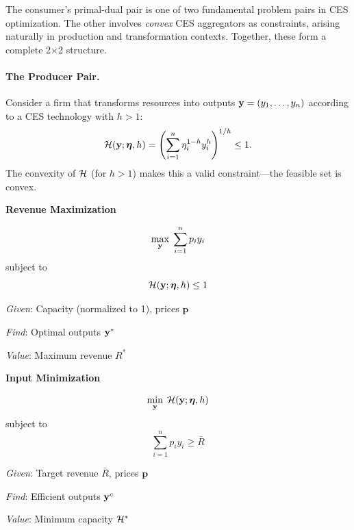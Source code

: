 The consumer's primal-dual pair is one of two fundamental problem pairs in CES optimization. The other involves \emph{convex} CES aggregators as constraints, arising naturally in production and transformation contexts. Together, these form a complete 2×2 structure.

\paragraph{The Producer Pair.}
Consider a firm that transforms resources into outputs $\mathbf{y} = (y_1, \ldots, y_n)$ according to a CES technology with $h > 1$:
\begin{equation}
\mathcal{H}(\mathbf{y}; \boldsymbol{\eta}, h) = \left( \sum_{i=1}^{n} \eta_i^{1-h} y_i^{h} \right)^{1/h} \leq 1.
\end{equation}
The convexity of $\mathcal{H}$ (for $h > 1$) makes this a valid constraint---the feasible set is convex.

\begin{tcolorbox}[
  enhanced,
  colback=white,
  colframe=gray!60,
  title={\textbf{The Producer Pair}},
  fonttitle=\bfseries,
  boxrule=0.8pt,
  arc=2pt
]
\begin{minipage}[t]{0.47\textwidth}
\begin{center}
\textbf{Revenue Maximization}
\end{center}
\vspace{-0.5em}
\begin{equation*}
\max_{\mathbf{y}} \; \sum_{i=1}^{n} p_i y_i
\end{equation*}
subject to
\begin{equation*}
\mathcal{H}(\mathbf{y}; \boldsymbol{\eta}, h) \leq 1
\end{equation*}

\medskip
\textit{Given}: Capacity (normalized to 1), prices $\mathbf{p}$

\textit{Find}: Optimal outputs $\mathbf{y}^*$

\textit{Value}: Maximum revenue $R^*$
\end{minipage}
\hfill
\begin{minipage}[t]{0.47\textwidth}
\begin{center}
\textbf{Input Minimization}
\end{center}
\vspace{-0.5em}
\begin{equation*}
\min_{\mathbf{y}} \; \mathcal{H}(\mathbf{y}; \boldsymbol{\eta}, h)
\end{equation*}
subject to
\begin{equation*}
\sum_{i=1}^{n} p_i y_i \geq \bar{R}
\end{equation*}

\medskip
\textit{Given}: Target revenue $\bar{R}$, prices $\mathbf{p}$

\textit{Find}: Efficient outputs $\mathbf{y}^c$

\textit{Value}: Minimum capacity $\mathcal{H}^*$
\end{minipage}
\end{tcolorbox}

